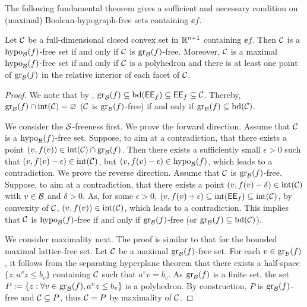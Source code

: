 The following fundamental theorem gives a sufficient and necessary condition on (maximal) Boolean-hypograph-free sets containing $\ee{f}$.
\begin{theorem}
\label{thm.free}
Let $\mathcal C$ be a full-dimensional  closed convex set in $\mathbb R^{n+1}$ containing  $\ee{f}$. Then  $\mathcal C$ is a  $\operatorname{hypo}_{\mathcal B}(f)$-free set if and only if $\mathcal C$ is $\operatorname{gr}_{\mathcal B}(f)$-free. Moreover, $\mathcal C$ is a maximal $\operatorname{hypo}_{\mathcal B}(f)$-free set if and only if $\mathcal C$ is a polyhedron and there is at least one point of  $\operatorname{gr}_{\mathcal B}(f)$ in the relative interior of each facet of $\mathcal C$.
\end{theorem}
\begin{proof}
We note that by , $\operatorname{gr}_{\mathcal B}(f) \subseteq \operatorname{bd}(\mathsf{EE}_{f} ) \subseteq  \mathsf{EE}_{f}  \subseteq \mathcal C$. Thereby,  $\operatorname{gr}_{\mathcal B}(f) \cap \operatorname{int}(\mathcal C) = \varnothing$ (\ie $\mathcal C$ is $\operatorname{gr}_{\mathcal B}(f)$-free) if and only if $\operatorname{gr}_{\mathcal B}(f) \subseteq \operatorname{bd}(\mathcal C)$.

We consider the  $\mathcal S$-freeness first. We prove the forward direction. Assume that $\mathcal C$ is a  $\operatorname{hypo}_{\mathcal B}(f)$-free set. Suppose, to aim at a contradiction, that there exists a point $(v,f(v)) \in \operatorname{int}(\mathcal C) \cap \operatorname{gr}_{\mathcal B}(f)$. Then  there exists a sufficiently small $\epsilon > 0$ such that $(v, f(v) -\epsilon) \in \operatorname{int}(\mathcal C)$, but $(v, f(v) -\epsilon)  \in  \operatorname{hypo}_{\mathcal B}(f)$, which leads to a contradiction. We prove the reverse direction. Assume that $\mathcal C$ is $\operatorname{gr}_{\mathcal B}(f)$-free.  Suppose, to aim at a contradiction, that there exists a point $(v, f(v) - \delta) \in \operatorname{int}(\mathcal C)$ with $v \in \mathcal B$ and $\delta> 0$. As, for some $\epsilon > 0$, $(v, f(v) + \epsilon) \subseteq \operatorname{int}(\mathsf{EE}_{f} ) \subseteq \operatorname{int}(\mathcal C)$, by convexity of $\mathcal C$, $(v,f(v)) \in \operatorname{int}(\mathcal C)$, which leads to a contradiction. This implies that $\mathcal C$ is  $\operatorname{hypo}_{\mathcal B}(f)$-free if and only if $\operatorname{gr}_{\mathcal B}(f)$-free (or $\operatorname{gr}_{\mathcal B}(f) \subseteq \operatorname{bd}(\mathcal C)$).

  We consider maximality next. The proof is similar to that \cite{basu2010maximal} for the bounded maximal lattice-free set.
  Let $\mathcal C$ be a maximal $\operatorname{gr}_{\mathcal B}(f)$-free set.
For each $v \in \operatorname{gr}_{\mathcal B}(f)$, it follows from the separating hyperplane theorem that there exists a half-space $\{z:a^vz \le b_v\}$ containing $\mathcal C$ such that $a^v v=b_v$.
   As $\operatorname{gr}_{\mathcal B}(f)$ is a finite set,  the set $P:=\{z:\forall v \in \operatorname{gr}_{\mathcal B}(f), a^vz \le b_v\}$ is a polyhedron. By construction, $P$ is $\operatorname{gr}_{\mathcal B}(f)$-free and $\mathcal C \subseteq P$, thus $\mathcal C=P$ by maximality of $\mathcal C$.


\end{proof}
